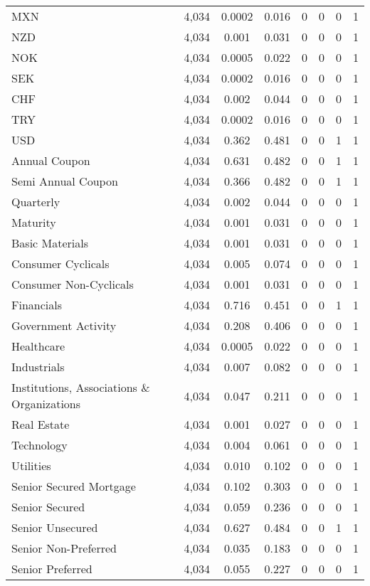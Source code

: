 \begin{table}[H]
\begin{tabular}{@{\extracolsep{5pt}}lccccccc}
MXN & 4,034 & 0.0002 & 0.016 & 0 & 0 & 0 & 1 \\ 
NZD & 4,034 & 0.001 & 0.031 & 0 & 0 & 0 & 1 \\ 
NOK & 4,034 & 0.0005 & 0.022 & 0 & 0 & 0 & 1 \\ 
SEK & 4,034 & 0.0002 & 0.016 & 0 & 0 & 0 & 1 \\ 
CHF & 4,034 & 0.002 & 0.044 & 0 & 0 & 0 & 1 \\ 
TRY & 4,034 & 0.0002 & 0.016 & 0 & 0 & 0 & 1 \\ 
USD & 4,034 & 0.362 & 0.481 & 0 & 0 & 1 & 1 \\ 
Annual Coupon & 4,034 & 0.631 & 0.482 & 0 & 0 & 1 & 1 \\ 
Semi Annual Coupon & 4,034 & 0.366 & 0.482 & 0 & 0 & 1 & 1 \\ 
Quarterly & 4,034 & 0.002 & 0.044 & 0 & 0 & 0 & 1 \\ 
Maturity & 4,034 & 0.001 & 0.031 & 0 & 0 & 0 & 1 \\ 
Basic Materials & 4,034 & 0.001 & 0.031 & 0 & 0 & 0 & 1 \\ 
Consumer Cyclicals & 4,034 & 0.005 & 0.074 & 0 & 0 & 0 & 1 \\ 
Consumer Non-Cyclicals & 4,034 & 0.001 & 0.031 & 0 & 0 & 0 & 1 \\ 
Financials & 4,034 & 0.716 & 0.451 & 0 & 0 & 1 & 1 \\ 
Government Activity & 4,034 & 0.208 & 0.406 & 0 & 0 & 0 & 1 \\ 
Healthcare & 4,034 & 0.0005 & 0.022 & 0 & 0 & 0 & 1 \\ 
Industrials & 4,034 & 0.007 & 0.082 & 0 & 0 & 0 & 1 \\ 
Institutions, Associations \& Organizations & 4,034 & 0.047 & 0.211 & 0 & 0 & 0 & 1 \\ 
Real Estate & 4,034 & 0.001 & 0.027 & 0 & 0 & 0 & 1 \\ 
Technology & 4,034 & 0.004 & 0.061 & 0 & 0 & 0 & 1 \\ 
Utilities & 4,034 & 0.010 & 0.102 & 0 & 0 & 0 & 1 \\ 
Senior Secured Mortgage & 4,034 & 0.102 & 0.303 & 0 & 0 & 0 & 1 \\ 
Senior Secured & 4,034 & 0.059 & 0.236 & 0 & 0 & 0 & 1 \\ 
Senior Unsecured & 4,034 & 0.627 & 0.484 & 0 & 0 & 1 & 1 \\ 
Senior Non-Preferred & 4,034 & 0.035 & 0.183 & 0 & 0 & 0 & 1 \\ 
Senior Preferred & 4,034 & 0.055 & 0.227 & 0 & 0 & 0 & 1 \\ 

\end{tabular}
\end{table}
